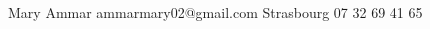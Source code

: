 \documentclass[lighthipster]{simplehipstercv}
\newlength{\rightcolwidth}
\begin{document}
\begin{paracol}{2}
\vfill{} %

\setlength{\parindent}{0pt}
\begin{minipage}[t]{\rightcolwidth}
\begin{center}\fontfamily{\sfdefault}\selectfont \color{black!70}
{\small Mary Ammar ammarmary02@gmail.com Strasbourg  07 32 69 41 65 %
}
\end{center}
\end{minipage}

\end{paracol}
\end{document}
